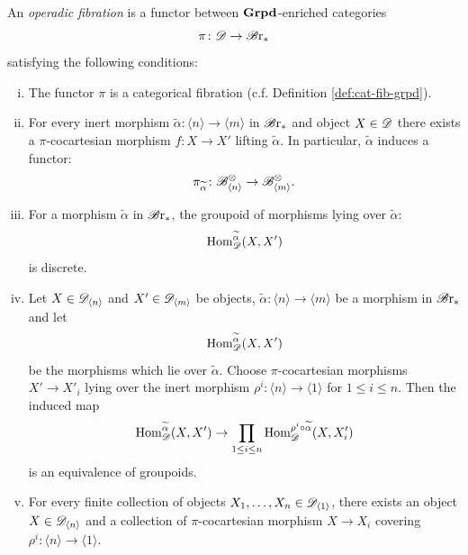 \begin{defin}\label{def:operadicfib}
    An {\em operadic fibration} is a functor between $\operatorname{\textbf{Grpd}}$-enriched categories
    \[
        \pi \colon \mathscr{D} \to \mathscr{B} \text{r}_{\ast}
    \]
    satisfying the following conditions:
    \begin{enumerate}[(i)]
    \item The functor $\pi$ is a categorical fibration (c.f. Definition
    \ref{def:cat-fib-grpd}).
    \item For every inert morphism $\widetilde{\alpha} \colon \langle n \rangle
    \to \langle m \rangle$ in $\mathscr{B} \text{r}_{\ast}$ and object $X \in \mathscr{D}$ there exists a
    $\pi$-cocartesian morphism $f \colon X \to X'$ lifting $\widetilde{\alpha}$. In
    particular, $\widetilde{\alpha}$ induces a functor: $$\pi_{\widetilde{\alpha}} \colon
    \mathscr{B}^{\otimes}_{\langle n \rangle} \to \mathscr{B}^{\otimes}_{\langle m \rangle}.$$
    \item For a morphism $\widetilde{\alpha}$ in $\mathscr{B} \text{r}_{\ast}$, the groupoid of
    morphisms lying over $\widetilde{\alpha}$:
    $$\operatorname{Hom}_{\mathscr{D}}^{\widetilde{\alpha}}(X, X')$$ is discrete.
    \item Let $X \in \mathscr{D}_{\langle n \rangle}$ and $X' \in \mathscr{D}_{\langle m \rangle}$
    be objects, $\widetilde{\alpha}  : \langle n \rangle \to \langle m \rangle$
    be a morphism in $\mathscr{B} \text{r}_{\ast}$ and let $$\operatorname{Hom}_{\mathscr{D}}^{\widetilde{\alpha}}(X, X')$$ be the 
    morphisms which lie over $\widetilde{\alpha}$. 
    Choose $\pi$-cocartesian morphisms $X' \to X'_i$ lying over the inert
    morphism $\rho^i \colon \langle n \rangle \to \langle 1 \rangle$ for $1 \leq
    i \leq n$. Then the induced map
    \[
        \operatorname{Hom}_{\mathscr{D}}^{\widetilde{\alpha}}(X, X') \to \prod_{1 \leq i \leq n} \operatorname{Hom}_{\mathscr{D}}^{\rho^i \circ \widetilde{\alpha}}(X, X_i')
    \]
    is an equivalence of groupoids. 
    
    \item For every finite collection of objects $X_1, \dots, X_n \in
    \mathscr{D}_{\langle 1 \rangle}$, there exists an object $X \in \mathscr{D}_{\langle n
    \rangle}$ and a collection of $\pi$-cocartesian morphism $X \to X_i$
    covering $\rho^i \colon \langle n \rangle \to \langle 1 \rangle$.
    \end{enumerate}
\end{defin}





